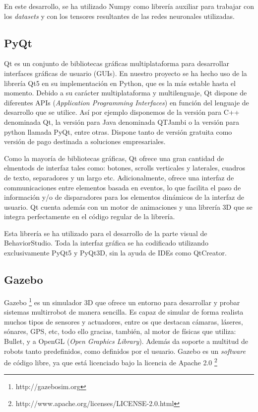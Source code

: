 En este desarrollo, se ha utilizado Numpy como librería auxiliar para trabajar con los \textit{datasets} y con los tensores resultantes de las redes neuronales utilizadas.


\subsection{PyQt}

Qt es un conjunto de bibliotecas gráficas multiplataforma para desarrollar interfaces gráficas de usuario (GUIs). En nuestro proyecto se ha hecho uso de la librería Qt5 en su implementación en Python, que es la más estable hasta el momento. Debido a su carácter multiplataforma y multilenguaje, Qt dispone de diferentes APIs (\textit{Application Programming Interfaces}) en función del lenguaje de desarrollo que se utilice. Así por ejemplo disponemos de la versión para C++ denominada Qt, la versión para Java denominada QTJambi o la versión para python llamada PyQt, entre otras. Dispone tanto de versión gratuita como versión de pago destinada a soluciones empresariales.

Como la mayoría de bibliotecas gráficas, Qt ofrece una gran cantidad de elmentods de interfaz tales como: botones, scrolls verticales y laterales, cuadros de texto, separadores y un largo etc. Adicionalmente, ofrece una interfaz de communicaciones entre elementos basada en eventos, lo que facilita el paso de información y/o de disparadores para los elementos dinámicos de la interfaz de usuario. Qt cuenta además con un motor de animaciones y una librería 3D que se integra perfectamente en el código regular de la librería.

Esta librería se ha utilizado para el desarrollo de la parte visual de BehaviorStudio. Toda la interfaz gráfica se ha codificado utilizando exclusivamente PyQt5 y PyQt3D, sin la ayuda de IDEs como QtCreator.

\subsection{Gazebo}

Gazebo \footnote{http://gazebosim.org} es un simulador 3D que ofrece un entorno para desarrollar y probar sistemas multirrobot de manera sencilla. Es capaz de simular de forma realista muchos tipos de sensores y actuadores, entre os que destacan cámaras, láseres, sónares, GPS, etc, todo ello gracias, también, al motor de físicas que utiliza: Bullet, y a OpenGL (\textit{Open Graphics Library}). Además da soporte a multitud de robots tanto predefinidos, como definidos por el usuario. Gazebo es un \textit{software} de código libre, ya que está licenciado bajo la licencia de Apache 2.0 \footnote{http://www.apache.org/licenses/LICENSE-2.0.html}

